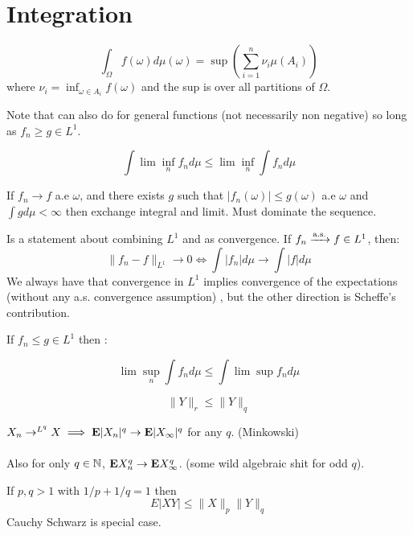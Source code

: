 \documentclass{article}
\newcommand\myworries[1]{\textcolor{red}{#1}}
\begin{document}
\section{Integration}
\begin{definition}
$$\int_\Omega f(\omega) d\mu(\omega) = \sup \left (\sum_{i=1}^n \nu_i \mu(A_i)\right)$$
where $\nu_i = \inf_{\omega \in A_i} f(\omega)$ and the sup is over all partitions of $\Omega$.
\end{definition}
\begin{theorem}[MCT]
Note that can also do for general functions (not necessarily non negative) so long as $f_n \geq g \in L^1$.
\end{theorem}
\begin{theorem}
$$\int \lim \inf_n f_n d\mu \leq \lim \inf_n \int f_n d\mu $$
\end{theorem}
\begin{theorem}[DCT]
If $f_n \to f$ a.e $\omega$, and there exists $g$ such that $|f_n(\omega)|\leq g(\omega)$ a.e $\omega$ and $\int gd\mu <\infty$ then exchange integral and limit. Must dominate the sequence. 
\end{theorem}

\begin{theorem}
Is a statement about combining $L^1$ and as convergence. If $f_n \xrightarrow{\mathrm{a.s.}} f\in L^1$, then:
$$\| f_n -f\|_{L^1} \to 0 \iff \int |f_n| d\mu \to \int |f|d\mu $$
We always have that convergence in $L^1$ implies convergence of the expectations (without any a.s. convergence assumption) , but the other direction is Scheffe's contribution. 
\end{theorem}



\begin{theorem}
If $f_n \leq g \in L^1$ then :

$$\lim \sup_n \int f_n d\mu \leq \int \lim \sup f_n d\mu$$
\end{theorem}

\begin{fact}
$$\|Y\|_r \leq \|Y\|_q$$
\end{fact}

\begin{fact}
$X_n\to^{L^q} X \implies \mathbf{E}|X_n|^q \to \mathbf{E}|X_\infty|^q$ for any $q$. (Minkowski)\\\\ Also for only $q\in \mathbb N$, $\mathbf{E} X_n^q \to \mathbf{E} X_\infty^q$. (some wild algebraic shit for odd $q$).

\end{fact}
\begin{theorem}[Holder's]
If $p,q>1$ with $1/p + 1/q = 1$ then 
$$E|XY| \leq \|X\|_p \|Y\|_q $$
Cauchy Schwarz is special case.
\end{theorem}
\end{document}
